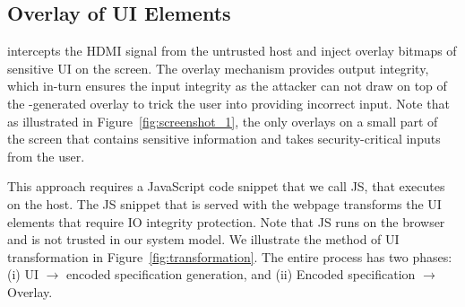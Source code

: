 \subsection{\device Overlay of UI Elements}
\label{sec:systemDesign:transformation}

\device intercepts the HDMI signal from the untrusted host and inject overlay bitmaps of sensitive UI on the screen. The overlay mechanism provides output integrity, which in-turn ensures the input integrity as the attacker can not draw on top of the \device-generated overlay to trick the user into providing incorrect input. Note that as illustrated in Figure~\ref{fig:screenshot_1}, the \device only overlays on a small part of the screen that contains sensitive information and takes
security-critical inputs from the user.

 
This approach requires a JavaScript code snippet that we call \name JS, that executes on the host. The \name JS snippet that is served with the webpage transforms the UI elements that require IO integrity protection. Note that \name JS runs on the browser and is not trusted in our system model. We illustrate the method of UI transformation in Figure~\ref{fig:transformation}. The entire process has two phases: (i) UI $\rightarrow$ encoded specification generation, and (ii) Encoded specification $\rightarrow$ Overlay.



